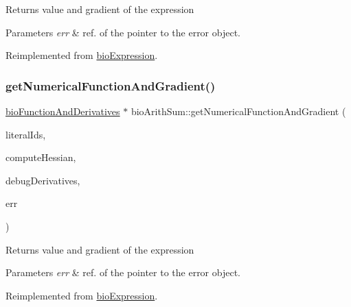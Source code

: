 \begin{DoxyReturn}{Returns}
value and gradient of the expression 
\end{DoxyReturn}

\begin{DoxyParams}{Parameters}
{\em err} & ref. of the pointer to the error object. \\
\hline
\end{DoxyParams}


Reimplemented from \hyperlink{classbio_expression_a91c81ce80c9e972c913b10f5f3c1ed13}{bio\+Expression}.

\mbox{\label{classbio_arith_sum_a18cf2d6545bce0712f755c6eaf69407a}} 
\subsubsection{\texorpdfstring{get\+Numerical\+Function\+And\+Gradient()}{getNumericalFunctionAndGradient()}\hspace{0.1cm}{\footnotesize\ttfamily [2/4]}}
{\footnotesize\ttfamily \hyperlink{classbio_function_and_derivatives}{bio\+Function\+And\+Derivatives} $\ast$ bio\+Arith\+Sum\+::get\+Numerical\+Function\+And\+Gradient (\begin{DoxyParamCaption}\item[{vector$<$ pat\+U\+Long $>$}]{literal\+Ids,  }\item[{pat\+Boolean}]{compute\+Hessian,  }\item[{pat\+Boolean}]{debug\+Derivatives,  }\item[{pat\+Error $\ast$\&}]{err }\end{DoxyParamCaption})\hspace{0.3cm}{\ttfamily [virtual]}}

\begin{DoxyReturn}{Returns}
value and gradient of the expression 
\end{DoxyReturn}

\begin{DoxyParams}{Parameters}
{\em err} & ref. of the pointer to the error object. \\
\hline
\end{DoxyParams}


Reimplemented from \hyperlink{classbio_expression_a91c81ce80c9e972c913b10f5f3c1ed13}{bio\+Expression}.

